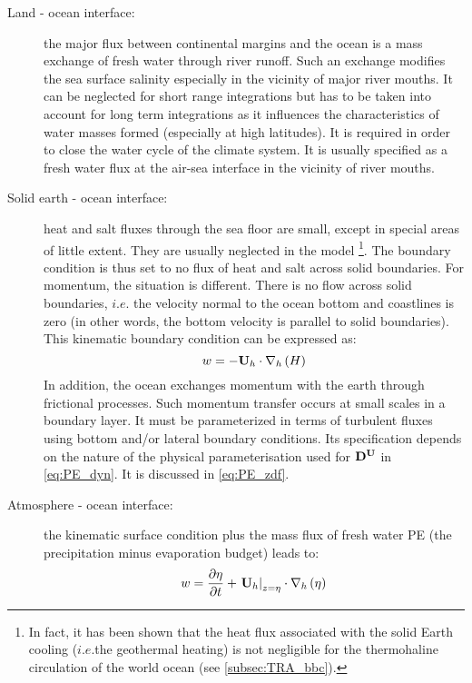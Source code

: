 \documentclass[../main/NEMO_manual]{subfiles}
\begin{document}
\begin{description}
\item[Land - ocean interface:]
  the major flux between continental margins and the ocean is a mass exchange of fresh water through river runoff.
  Such an exchange modifies the sea surface salinity especially in the vicinity of major river mouths.
  It can be neglected for short range integrations but has to be taken into account for long term integrations as
  it influences the characteristics of water masses formed (especially at high latitudes).
  It is required in order to close the water cycle of the climate system.
  It is usually specified as a fresh water flux at the air-sea interface in the vicinity of river mouths.
\item[Solid earth - ocean interface:]
  heat and salt fluxes through the sea floor are small, except in special areas of little extent.
  They are usually neglected in the model
  \footnote{
    In fact, it has been shown that the heat flux associated with the solid Earth cooling
    ($i.e.$the geothermal heating) is not negligible for the thermohaline circulation of the world ocean
    (see \autoref{subsec:TRA_bbc}).
  }.
  The boundary condition is thus set to no flux of heat and salt across solid boundaries.
  For momentum, the situation is different. There is no flow across solid boundaries,
  $i.e.$ the velocity normal to the ocean bottom and coastlines is zero (in other words,
  the bottom velocity is parallel to solid boundaries). This kinematic boundary condition
  can be expressed as:
  \begin{equation}
    \label{eq:PE_w_bbc}
    w = -{\rm {\bf U}}_h \cdot  \nabla _h \left( H \right)
  \end{equation}
  In addition, the ocean exchanges momentum with the earth through frictional processes.
  Such momentum transfer occurs at small scales in a boundary layer.
  It must be parameterized in terms of turbulent fluxes using bottom and/or lateral boundary conditions.
  Its specification depends on the nature of the physical parameterisation used for
  ${\rm {\bf D}}^{\rm {\bf U}}$ in \autoref{eq:PE_dyn}.
  It is discussed in \autoref{eq:PE_zdf}.%
\item[Atmosphere - ocean interface:]
  the kinematic surface condition plus the mass flux of fresh water PE (the precipitation minus evaporation budget)
  leads to:
  \[
    w = \frac{\partial \eta }{\partial t}
    + \left. {{\rm {\bf U}}_h } \right|_{z=\eta } \cdot  \nabla _h \left( \eta \right)
\]
\end{description}
\end{document}
